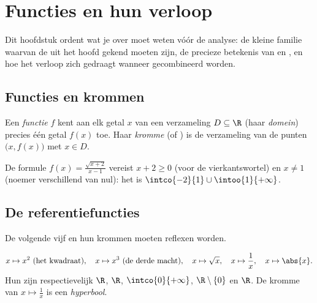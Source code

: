 \chapter{Functies en hun verloop}\label{ch:g11:func}

Dit hoofdstuk ordent wat je over  moet weten vóór de analyse: de
kleine familie \emph{} waarvan de  uit het hoofd
gekend moeten zijn, de precieze betekenis van \emph{} en
\emph{}, en hoe het verloop zich gedraagt wanneer  gecombineerd
worden.

\section{Functies en krommen}

\begin{definition}\label{def:g11:func:function}
Een \emph{functie} $f$ kent aan elk getal $x$ van een
verzameling $D \subseteq \R$ (haar \emph{domein}) precies één
getal $f(x)$ toe. Haar \emph{kromme} (of ) is de verzameling van de
punten $\bigl(x, f(x)\bigr)$ met $x \in D$.
\end{definition}

\begin{example}
De formule $f(x) = \frac{\sqrt{x+2}}{x-1}$ vereist $x + 2 \geq 0$ (voor de
vierkantswortel) en $x \neq 1$ (noemer verschillend van nul): het  is
$\intco{-2}{1} \cup \intoo{1}{+\infty}$.
\end{example}

\section{De referentiefuncties}

De volgende vijf  en hun krommen moeten reflexen worden.

\begin{definition}[Referentiefuncties]\label{def:g11:func:reference}
\[
x \mapsto x^2 \text{ (het kwadraat)}, \quad
x \mapsto x^3 \text{ (de derde macht)}, \quad
x \mapsto \sqrt{x}, \quad
x \mapsto \frac{1}{x}, \quad
x \mapsto \abs{x}.
\]
Hun  zijn respectievelijk $\R$, $\R$, $\intco{0}{+\infty}$,
$\R \setminus \{0\}$ en $\R$. De kromme van $x \mapsto \frac1x$ is een
\emph{hyperbool}.
\end{definition}

